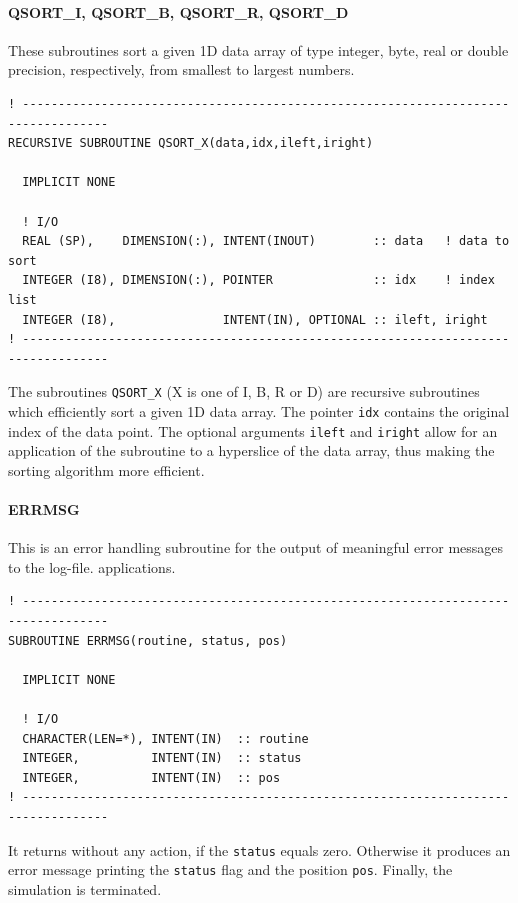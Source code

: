\documentclass[11pt,twoside]{article}
\begin{document}
\paragraph{QSORT\_I, QSORT\_B, QSORT\_R, QSORT\_D\\ \label{QSORT}}
These subroutines sort a given 1D data array of type integer, byte, real
or double precision, respectively, from smallest to largest numbers.

\begin{verbatim}
! ----------------------------------------------------------------------------------
RECURSIVE SUBROUTINE QSORT_X(data,idx,ileft,iright)

  IMPLICIT NONE

  ! I/O
  REAL (SP),    DIMENSION(:), INTENT(INOUT)        :: data   ! data to sort
  INTEGER (I8), DIMENSION(:), POINTER              :: idx    ! index list
  INTEGER (I8),               INTENT(IN), OPTIONAL :: ileft, iright
! ----------------------------------------------------------------------------------
\end{verbatim}
The subroutines \verb|QSORT_X| (X is one of I, B, R or D) are
recursive subroutines which efficiently 
sort a given 1D data array. The pointer \verb|idx|
contains the original index of the data point. The optional arguments
\verb|ileft| and \verb|iright| allow for an application of the subroutine
to a hyperslice of the data array, thus making the sorting algorithm more 
efficient.

\paragraph{ERRMSG\\ \label{ERRMSG}}
This is an error handling subroutine for the output of meaningful
error messages to the log-file.
applications.
\begin{verbatim}
! ----------------------------------------------------------------------------------
SUBROUTINE ERRMSG(routine, status, pos)

  IMPLICIT NONE

  ! I/O
  CHARACTER(LEN=*), INTENT(IN)  :: routine
  INTEGER,          INTENT(IN)  :: status
  INTEGER,          INTENT(IN)  :: pos
! ----------------------------------------------------------------------------------
\end{verbatim}
It returns without any action, if the \verb|status| equals zero.
Otherwise it produces an error message printing the \verb|status| flag
 and the position \verb|pos|. Finally, the simulation is terminated.
\end{document}
